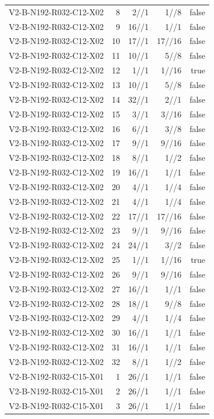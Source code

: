 {\begin{longtable}{lrrrr}
V2-B-N192-R032-C12-X02 & 8 & 2//1 & 1//8 & false \\
V2-B-N192-R032-C12-X02 & 9 & 16//1 & 1//1 & false \\
V2-B-N192-R032-C12-X02 & 10 & 17//1 & 17//16 & false \\
V2-B-N192-R032-C12-X02 & 11 & 10//1 & 5//8 & false \\
V2-B-N192-R032-C12-X02 & 12 & 1//1 & 1//16 & true \\
V2-B-N192-R032-C12-X02 & 13 & 10//1 & 5//8 & false \\
V2-B-N192-R032-C12-X02 & 14 & 32//1 & 2//1 & false \\
V2-B-N192-R032-C12-X02 & 15 & 3//1 & 3//16 & false \\
V2-B-N192-R032-C12-X02 & 16 & 6//1 & 3//8 & false \\
V2-B-N192-R032-C12-X02 & 17 & 9//1 & 9//16 & false \\
V2-B-N192-R032-C12-X02 & 18 & 8//1 & 1//2 & false \\
V2-B-N192-R032-C12-X02 & 19 & 16//1 & 1//1 & false \\
V2-B-N192-R032-C12-X02 & 20 & 4//1 & 1//4 & false \\
V2-B-N192-R032-C12-X02 & 21 & 4//1 & 1//4 & false \\
V2-B-N192-R032-C12-X02 & 22 & 17//1 & 17//16 & false \\
V2-B-N192-R032-C12-X02 & 23 & 9//1 & 9//16 & false \\
V2-B-N192-R032-C12-X02 & 24 & 24//1 & 3//2 & false \\
V2-B-N192-R032-C12-X02 & 25 & 1//1 & 1//16 & true \\
V2-B-N192-R032-C12-X02 & 26 & 9//1 & 9//16 & false \\
V2-B-N192-R032-C12-X02 & 27 & 16//1 & 1//1 & false \\
V2-B-N192-R032-C12-X02 & 28 & 18//1 & 9//8 & false \\
V2-B-N192-R032-C12-X02 & 29 & 4//1 & 1//4 & false \\
V2-B-N192-R032-C12-X02 & 30 & 16//1 & 1//1 & false \\
V2-B-N192-R032-C12-X02 & 31 & 16//1 & 1//1 & false \\
V2-B-N192-R032-C12-X02 & 32 & 8//1 & 1//2 & false \\
V2-B-N192-R032-C15-X01 & 1 & 26//1 & 1//1 & false \\
V2-B-N192-R032-C15-X01 & 2 & 26//1 & 1//1 & false \\
V2-B-N192-R032-C15-X01 & 3 & 26//1 & 1//1 & false \\

\end{longtable}}

